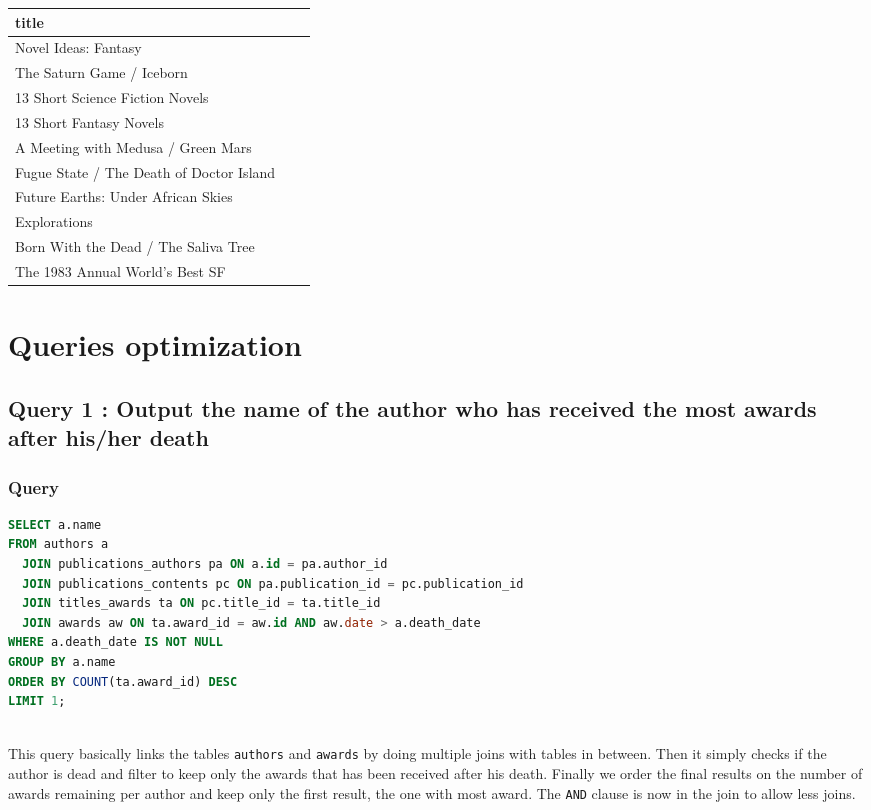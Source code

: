 \documentclass[doubleside, titlepage]{article}
\begin{document}
\begin{enumerate}
	\begin{tabular}{|l|c|r|}
	  \hline
		title\\
	  \hline
Novel Ideas: Fantasy\\
The Saturn Game / Iceborn\\
13 Short Science Fiction Novels\\
13 Short Fantasy Novels\\
A Meeting with Medusa / Green Mars\\
Fugue State / The Death of Doctor Island\\
Future Earths: Under African Skies\\
Explorations\\
Born With the Dead / The Saliva Tree\\
The 1983 Annual World's Best SF\\
	  \hline
	\end{tabular}
\end{enumerate}

\newpage

\section{Queries optimization}

\subsection{Query 1 : Output the name of the author who has received the most awards after his/her death}

\subsubsection{Query}
		\begin{lstlisting}[language=SQL,showspaces=false,basicstyle=\ttfamily,numberstyle=\tiny,commentstyle=\color{gray}]
SELECT a.name
FROM authors a
  JOIN publications_authors pa ON a.id = pa.author_id
  JOIN publications_contents pc ON pa.publication_id = pc.publication_id
  JOIN titles_awards ta ON pc.title_id = ta.title_id
  JOIN awards aw ON ta.award_id = aw.id AND aw.date > a.death_date
WHERE a.death_date IS NOT NULL
GROUP BY a.name
ORDER BY COUNT(ta.award_id) DESC
LIMIT 1;
		\end{lstlisting}

~\\	
This query basically links the tables \texttt{authors} and \texttt{awards} by doing multiple joins with tables in between. Then it simply checks if the author is dead and filter to keep only the awards that has been received after his death. Finally we order the final results on the number of awards remaining per author and keep only the first result, the one with most award. The \texttt{AND} clause is now in the join to allow less joins.~\\
		
\end{document}
